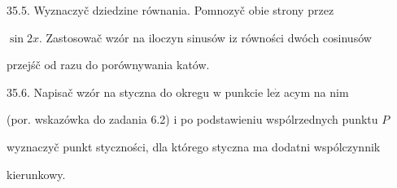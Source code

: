 \documentclass[a4paper,12pt]{article}
\begin{document}
35.5. Wyznaczyč dziedzine równania. Pomnozyč obie strony przez

$\sin 2x$. Zastosowač wzór na iloczyn sinusów $\mathrm{i}\mathrm{z}$ równości dwóch cosinusów

przejśč od razu do porównywania katów.

35.6. Napisač wzór na styczna do okregu $\mathrm{w}$ punkcie $\mathrm{l}\mathrm{e}\dot{\mathrm{z}}$ acym na nim

(por. wskazówka do zadania 6.2) $\mathrm{i}$ po podstawieniu wspólrzednych punktu $P$

wyznaczyč punkt styczności, dla którego styczna ma dodatni wspólczynnik

kierunkowy.
\end{document}
